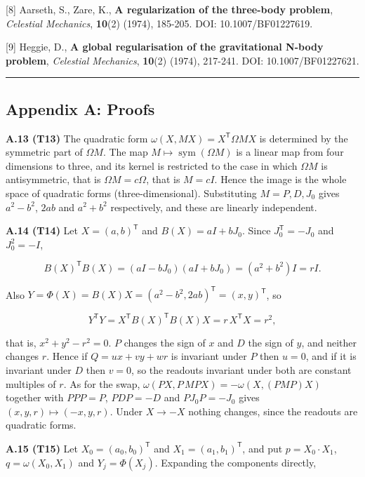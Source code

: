 \documentclass[
  a4paper,
]{article}
\begin{document}
{[}8{]} Aarseth, S., Zare, K., \textbf{A regularization of the
three-body problem}, \emph{Celestial Mechanics}, \textbf{10}(2) (1974),
185-205. DOI: 10.1007/BF01227619.

{[}9{]} Heggie, D., \textbf{A global regularisation of the gravitational
N-body problem}, \emph{Celestial Mechanics}, \textbf{10}(2) (1974),
217-241. DOI: 10.1007/BF01227621.

\begin{center}\rule{0.5\linewidth}{0.5pt}\end{center}

\subsection{Appendix A: Proofs}\label{appendix-a-proofs}

\textbf{A.13 (T13)} The quadratic form
\(\omega(X,MX)=X^{\mathsf T}\Omega MX\) is determined by the symmetric
part of \(\Omega M\). The map \(M\mapsto\operatorname{sym}(\Omega M)\)
is a linear map from four dimensions to three, and its kernel is
restricted to the case in which \(\Omega M\) is antisymmetric, that is
\(\Omega M=c\Omega\), that is \(M=cI\). Hence the image is the whole
space of quadratic forms (three-dimensional). Substituting \(M=P,D,J_0\)
gives \(a^2-b^2\), \(2ab\) and \(a^2+b^2\) respectively, and these are
linearly independent.

\textbf{A.14 (T14)} Let \(X=(a,b)^{\mathsf T}\) and \(B(X)=aI+bJ_0\).
Since \(J_0^{\mathsf T}=-J_0\) and \(J_0^2=-I\),

\[
B(X)^{\mathsf T}B(X)=(aI-bJ_0)(aI+bJ_0)=(a^2+b^2)I=rI.
\]

Also \(Y=\Phi(X)=B(X)X=(a^2-b^2,2ab)^{\mathsf T}=(x,y)^{\mathsf T}\), so

\[
Y^{\mathsf T}Y=X^{\mathsf T}B(X)^{\mathsf T}B(X)X=r\,X^{\mathsf T}X=r^2,
\]

that is, \(x^2+y^2-r^2=0\). \(P\) changes the sign of \(x\) and \(D\)
the sign of \(y\), and neither changes \(r\). Hence if \(Q=ux+vy+wr\) is
invariant under \(P\) then \(u=0\), and if it is invariant under \(D\)
then \(v=0\), so the readouts invariant under both are constant
multiples of \(r\). As for the swap,
\(\omega(PX,P\,MPX)=-\omega(X,(PMP)X)\) together with \(PPP=P\),
\(PDP=-D\) and \(PJ_0P=-J_0\) gives \((x,y,r)\mapsto(-x,y,r)\). Under
\(X\to-X\) nothing changes, since the readouts are quadratic forms.

\textbf{A.15 (T15)} Let \(X_0=(a_0,b_0)^{\mathsf T}\) and
\(X_1=(a_1,b_1)^{\mathsf T}\), and put \(p=X_0\cdot X_1\),
\(q=\omega(X_0,X_1)\) and \(Y_j=\Phi(X_j)\). Expanding the components
directly,
\end{document}
